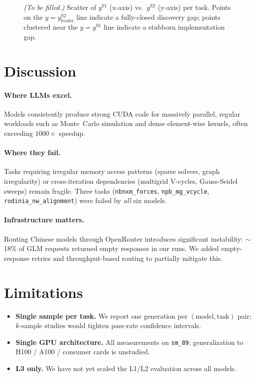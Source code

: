 \documentclass{article}
\begin{document}
\begin{figure}[ht]
\centering
\caption{\emph{(To be filled.)} Scatter of $y^{\mathrm{S1}}$ (x-axis)
vs.\ $y^{\mathrm{S2}}$ (y-axis) per task. Points on the $y = y^{\mathrm{S2}}_{\mathrm{leader}}$ line indicate a fully-closed discovery gap;
points clustered near the $y = y^{\mathrm{S1}}$ line indicate a
stubborn implementation gap.}
\label{fig:transfer}
\end{figure}

\section{Discussion}
\label{sec:discussion}

\paragraph{Where LLMs excel.} Models consistently produce strong CUDA code for massively parallel, regular workloads such as Monte~Carlo simulation and dense element-wise kernels, often exceeding $1000\times$ speedup.

\paragraph{Where they fail.} Tasks requiring irregular memory access patterns (sparse solvers, graph irregularity) or cross-iteration dependencies (multigrid V-cycles, Gauss-Seidel sweeps) remain fragile. Three tasks (\texttt{nbnxm\_forces}, \texttt{npb\_mg\_vcycle}, \texttt{rodinia\_nw\_alignment}) were failed by \emph{all} six models.

\paragraph{Infrastructure matters.} Routing Chinese models through OpenRouter introduces significant instability: $\sim$18\% of GLM requests returned empty responses in our runs. We added empty-response retries and throughput-based routing to partially mitigate this.

\section{Limitations}
\label{sec:limitations}

\begin{itemize}
  \item \textbf{Single sample per task.} We report one generation per $(\text{model},\text{task})$ pair; $k$-sample studies would tighten pass-rate confidence intervals.
  \item \textbf{Single GPU architecture.} All measurements on \texttt{sm\_89}; generalization to H100 / A100 / consumer cards is unstudied.
  \item \textbf{L3 only.} We have not yet scaled the L1/L2 evaluation across all models.
\end{itemize}
\end{document}
